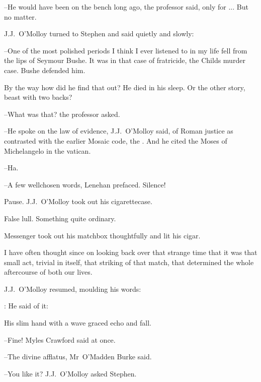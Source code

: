 --He would have been on the bench long ago,
the professor said,
only for ...
But no matter.

J.J.~O'Molloy turned to Stephen
and said quietly and slowly:

--One of the most polished periods
I think I ever listened to in my life
fell from the lips of Seymour Bushe.
It was in that case of fratricide,
the Childs murder case.
Bushe defended him.


By the way how did he find that out?
He died in his sleep.
Or the other story,
beast with two backs?

--What was that?
the professor asked.



--He spoke on the law of evidence,
J.J.~O'Molloy said,
of Roman justice
as contrasted with the earlier Mosaic code,
the .
And he cited the Moses of Michelangelo in the vatican.

--Ha.

--A few wellchosen words,
Lenehan prefaced.
Silence!

Pause.
J.J.~O'Molloy took out his cigarettecase.

False lull.
Something quite ordinary.

Messenger took out his matchbox thoughtfully and lit his cigar.

I have often thought since
on looking back over that strange time
that it was that small act,
trivial in itself,
that striking of that match,
that determined the whole aftercourse of both our lives.



J.J.~O'Molloy resumed,
moulding his words:

\jjom:
He said of it:

His slim hand with a wave graced echo and fall.

--Fine!
Myles Crawford said at once.

--The divine afflatus,
Mr~O'Madden Burke said.

--You like it?
J.J.~O'Molloy asked Stephen.

